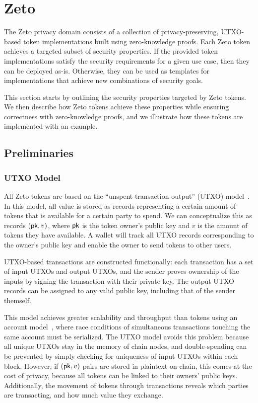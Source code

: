 \section{Zeto}

The Zeto privacy domain consists of a collection of privacy-preserving, UTXO-based token implementations built using zero-knowledge proofs. Each Zeto token achieves a targeted subset of security properties. If the provided token implementations satisfy the security requirements for a given use case, then they can be deployed as-is. Otherwise, they can be used as templates for implementations that achieve new combinations of security goals.

This section starts by outlining the security properties targeted by Zeto tokens. We then describe how Zeto tokens achieve these properties while ensuring correctness with zero-knowledge proofs, and we illustrate how these tokens are implemented with an example.


\subsection{Preliminaries}

\subsubsection{UTXO Model}

All Zeto tokens are based on the ``unspent transaction output'' (UTXO) model~\cite{TODO}. In this model, all value is stored as records representing a certain amount of tokens that is available for a certain party to spend. We can conceptualize this as records $(\mathsf{pk}, v)$, where $\mathsf{pk}$ is the token owner's public key and $v$ is the amount of tokens they have available. A wallet will track all UTXO records corresponding to the owner's public key and enable the owner to send tokens to other users.

UTXO-based transactions are constructed functionally: each transaction has a set of input UTXOs and output UTXOs, and the sender proves ownership of the inputs by signing the transaction with their private key. The output UTXO records can be assigned to any valid public key, including that of the sender themself.

This model achieves greater scalability and throughput than tokens using an account model~\cite{TODO}, where race conditions of simultaneous transactions touching the same account must be serialized. The UTXO model avoids this problem because all unique UTXOs stay in the memory of chain nodes, and double-spending can be prevented by simply checking for uniqueness of input UTXOs within each block. However, if $(\mathsf{pk}, v)$ pairs are stored in plaintext on-chain, this comes at the cost of privacy, because all tokens can be linked to their owners' public keys. Additionally, the movement of tokens through transactions reveals which parties are transacting, and how much value they exchange.


